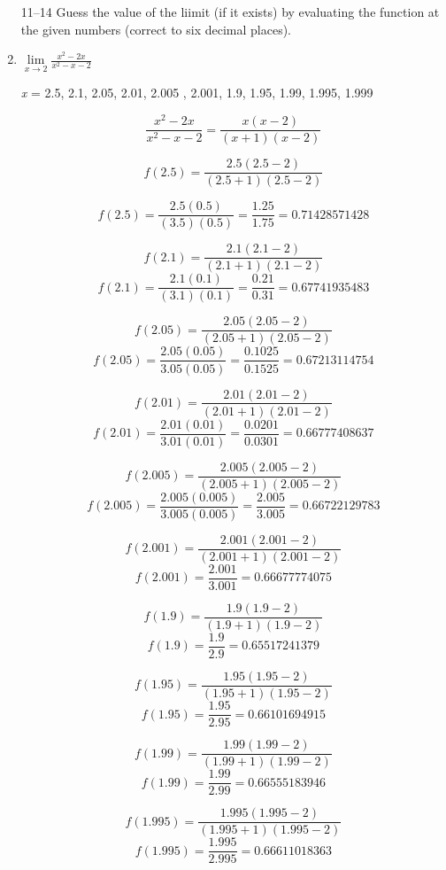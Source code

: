 \documentclass{article}
\begin{document}
\begin{enumerate}
			\item[11--14] Guess the value of the liimit (if it exists) by evaluating the function at the given numbers (correct to six decimal places).
			
			\item $\lim \limits_{x \to 2} \frac{x^2 - 2x}{x^2 - x - 2}$ 
			
			  \emph{x} = 2.5, 2.1, 2.05, 2.01, 2.005 , 2.001, 1.9, 1.95, 1.99, 1.995, 1.999
			  
			  $$\frac{x^2 - 2x}{x^2 - x - 2} = \frac{x(x - 2)}{(x + 1)(x - 2)}$$
			  
			  $$f(2.5) = \frac{2.5(2.5 - 2)}{(2.5 + 1)(2.5 - 2)}$$
			  
			  $$f(2.5) = \frac{2.5(0.5)}{(3.5)(0.5)} = \frac{1.25}{1.75} = 0.71428571428$$
			  
			  $$f(2.1) = \frac{2.1(2.1 - 2)}{(2.1 + 1)(2.1 - 2)}$$
			  $$f(2.1) = \frac{2.1(0.1)}{(3.1)(0.1)} = \frac{0.21}{0.31} = 0.67741935483$$
			  
			  $$f(2.05) = \frac{2.05(2.05 - 2)}{(2.05 + 1)(2.05 - 2)}$$
			  $$f(2.05) = \frac{2.05(0.05)}{3.05(0.05)} = \frac{0.1025}{0.1525} = 0.67213114754$$
			  
			  $$f(2.01) = \frac{2.01(2.01 - 2)}{(2.01 + 1)(2.01 - 2)}$$
			  $$f(2.01) = \frac{2.01(0.01)}{3.01(0.01)} = \frac{0.0201}{0.0301} = 0.66777408637$$
			  
			  $$f(2.005) = \frac{2.005(2.005 - 2)}{(2.005 + 1)(2.005 - 2)} $$ 
			  $$f(2.005) = \frac{2.005(0.005)}{3.005(0.005)} = \frac{2.005}{3.005} = 0.66722129783$$
			  
			  $$f(2.001) = \frac{2.001(2.001 - 2)}{(2.001 + 1)(2.001 - 2)}$$
			  $$f(2.001) = \frac{2.001}{3.001} = 0.66677774075$$
			  
			  $$f(1.9) = \frac{1.9(1.9 - 2)}{(1.9 + 1)(1.9 - 2)}$$
			  $$f(1.9) = \frac{1.9}{2.9} = 0.65517241379$$
			  
			  $$f(1.95) = \frac{1.95(1.95 - 2)}{(1.95 + 1)(1.95 - 2)}$$
			  $$f(1.95) = \frac{1.95}{2.95} = 0.66101694915$$
			  
			  $$f(1.99) = \frac{1.99(1.99 - 2)}{(1.99 + 1)(1.99 - 2)}$$
			  $$f(1.99) = \frac{1.99}{2.99} = 0.66555183946$$
			  
			  $$f(1.995) = \frac{1.995(1.995 - 2)}{(1.995 + 1)(1.995 - 2)}$$
			  $$f(1.995) = \frac{1.995}{2.995} = 0.66611018363$$
			  

\end{enumerate}
\end{document}
